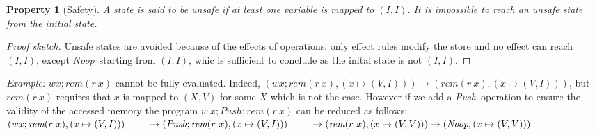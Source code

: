\documentclass[preprint,12pt]{elsarticle}
\newcommand{\symb}[1]{\textit{#1}}
\newcommand{\noop}{\symb{Noop}}
\newcommand{\Push}{\symb{Push}}
\newcommand{\rem}[1]{\symb{rem}(#1)}
\newtheorem{Property}{Property}
\begin{document}
\begin{Property}[Safety]\label{prop:safe}
A state is said to be \emph{unsafe} if at least one variable is mapped to 
$(I,I)$.
It is impossible to reach an unsafe state from the initial state.
\end{Property}
\begin{proof}[Proof sketch] 
Unsafe states are avoided  because of the effects of operations: 
only effect rules modify the store and no effect can reach $(I,I)$, except 
\noop\ starting from $(I,I)$, whic is sufficient to conclude as the inital state is not $(I,I)$.
\end{proof}

\noindent
   \emph{Example:} 
    $w x;\rem{r~x}$ cannot be fully evaluated. Indeed, $(w x;\rem{r~x},(x\mapsto 
    (V,I)))\to (\rem{r~x},(x\mapsto (V,I)))$, but  $\rem{r~x}$ requires that $x$ is 
    mapped to $(X,V)$ for some $X$ which is not the case.
However if we add a \Push\ operation to ensure the validity of the accessed memory the 
program $w~x;Push;\rem{r~x}$ can be reduced as follows:\\
$(w x;\rem{r~x},(x\mapsto (V,I)))\\~\qquad\to (\Push;\rem{r~x},(x\mapsto 
(V,I)))\\~\qquad\to 
(\rem{r~x},(x\mapsto (V,V)))\to (\noop,(x\mapsto (V,V)))$
\end{document}
